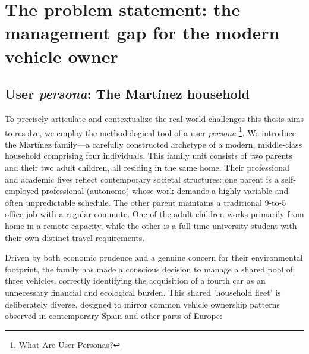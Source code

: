 \section{The problem statement: the management gap for the modern vehicle owner}

\subsection{User \textit{persona}: The Martínez household}

To precisely articulate and contextualize the real-world challenges this thesis aims to resolve, we employ the methodological tool of a user \textit{persona} \footnote{\href{https://resources.scrumalliance.org/Article/user-personas}{What Are User Personas?}}. We introduce the Martínez family—a carefully constructed archetype of a modern, middle-class household comprising four individuals. This family unit consists of two parents and their two adult children, all residing in the same home. Their professional and academic lives reflect contemporary societal structures: one parent is a self-employed professional (\gls{autonomo}) whose work demands a highly variable and often unpredictable schedule. The other parent maintains a traditional 9-to-5 office job with a regular commute. One of the adult children works primarily from home in a remote capacity, while the other is a full-time university student with their own distinct travel requirements.

\textgap

Driven by both economic prudence and a genuine concern for their environmental footprint, the family has made a conscious decision to manage a shared pool of three vehicles, correctly identifying the acquisition of a fourth car as an unnecessary financial and ecological burden. This shared 'household fleet' is deliberately diverse, designed to mirror common vehicle ownership patterns observed in contemporary Spain and other parts of Europe:

